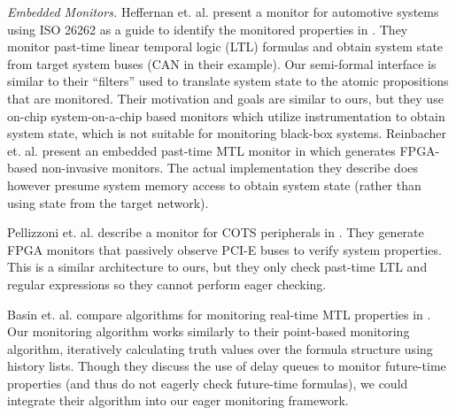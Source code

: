 \textit{Embedded Monitors.}
Heffernan et. al. present a monitor for automotive systems using ISO 26262 as a guide to identify the monitored properties in \cite{Heffernan2014}. They monitor past-time linear temporal logic (LTL) formulas and obtain system state from target system buses (CAN in their example). Our semi-formal interface is similar to their ``filters'' used to translate system state to the atomic propositions that are monitored. Their motivation and goals are similar to ours, but they use on-chip system-on-a-chip based monitors which utilize instrumentation to obtain system state, which is not suitable for monitoring black-box systems.
Reinbacher et. al. present an embedded past-time MTL monitor in \cite{Reinbacher2013} which generates FPGA-based non-invasive monitors. 
The actual implementation they describe does however presume system memory access to obtain system state (rather than using state from the target network).

Pellizzoni et. al. describe a monitor for COTS peripherals in \cite{Pellizzoni2008}. They generate FPGA monitors that passively observe PCI-E buses to verify system properties. This is a similar architecture to ours, but they only check past-time LTL and regular expressions so they cannot perform eager checking.

Basin et. al. compare algorithms for monitoring real-time MTL properties in \cite{Basin2012}. Our monitoring algorithm works similarly to their point-based monitoring algorithm, iteratively calculating truth values over the formula structure using history lists. Though they discuss the use of delay queues to monitor future-time properties (and thus do not eagerly check future-time formulas), we could integrate their algorithm into our eager monitoring framework.
